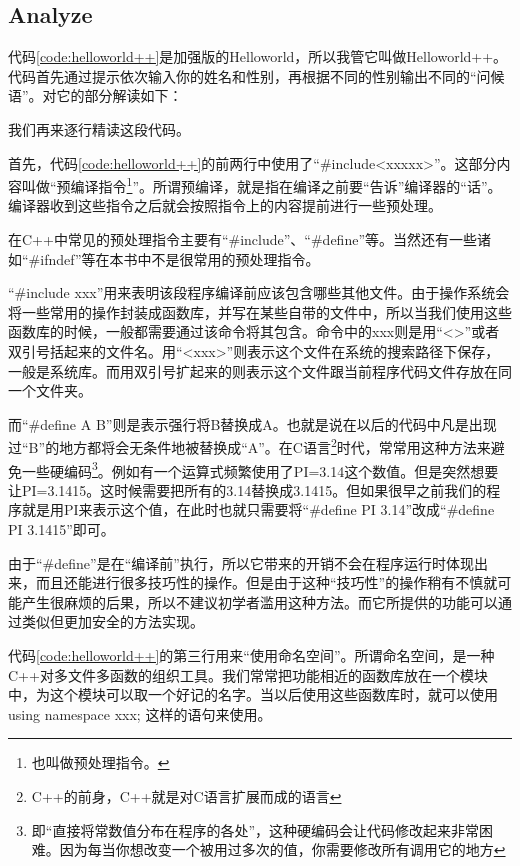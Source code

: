\subsection{Analyze}
代码\ref{code:helloworld++}是加强版的Helloworld，所以我管它叫做Helloworld++。代码首先通过提示依次输入你的姓名和性别，再根据不同的性别输出不同的“问候语”。对它的部分解读如下：
\begin{quote}
\showremarks
\end{quote}

我们再来逐行精读这段代码。

首先，代码\ref{code:helloworld++}的前两行中使用了“\#include<xxxxx>”。这部分内容叫做“预编译指令\footnote{也叫做预处理指令。}”。所谓预编译，就是指在编译之前要“告诉”编译器的“话”。编译器收到这些指令之后就会按照指令上的内容提前进行一些预处理。

在C++中常见的预处理指令主要有“\#include”、“\#define”等。当然还有一些诸如“\#ifndef”等在本书中不是很常用的预处理指令。

“\#include xxx”用来表明该段程序编译前应该包含哪些其他文件。由于操作系统会将一些常用的操作封装成函数库，并写在某些自带的文件中，所以当我们使用这些函数库的时候，一般都需要通过该命令将其包含。命令中的xxx则是用“<>”或者双引号括起来的文件名。用“<xxx>”则表示这个文件在系统的搜索路径下保存，一般是系统库。而用双引号扩起来的则表示这个文件跟当前程序代码文件存放在同一个文件夹。

而“\#define A B”则是表示强行将B替换成A。也就是说在以后的代码中凡是出现过“B”的地方都将会无条件地被替换成“A”。在C语言\footnote{C++的前身，C++就是对C语言扩展而成的语言}时代，常常用这种方法来避免一些硬编码\footnote{即“直接将常数值分布在程序的各处”，这种硬编码会让代码修改起来非常困难。因为每当你想改变一个被用过多次的值，你需要修改所有调用它的地方}。例如有一个运算式频繁使用了PI=3.14这个数值。但是突然想要让PI=3.1415。这时候需要把所有的3.14替换成3.1415。但如果很早之前我们的程序就是用PI来表示这个值，在此时也就只需要将“\#define PI 3.14”改成“\#define PI 3.1415”即可。

由于“\#define”是在“编译前”执行，所以它带来的开销不会在程序运行时体现出来，而且还能进行很多技巧性的操作。但是由于这种“技巧性”的操作稍有不慎就可能产生很麻烦的后果，所以不建议初学者滥用这种方法。而它所提供的功能可以通过类似但更加安全的方法实现。

代码\ref{code:helloworld++}的第三行用来“使用命名空间”。所谓命名空间，是一种C++对多文件多函数的组织工具。我们常常把功能相近的函数库放在一个模块中，为这个模块可以取一个好记的名字。当以后使用这些函数库时，就可以使用using namespace xxx; 这样的语句来使用。

